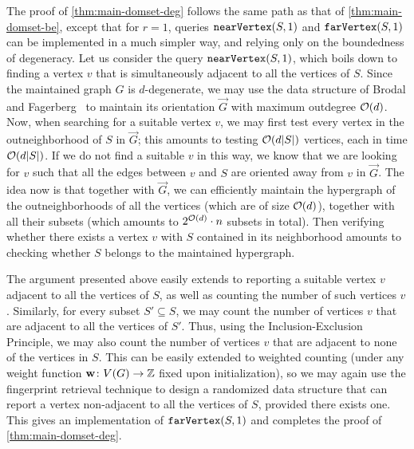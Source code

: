 \medskip

The proof of \cref{thm:main-domset-deg} follows the same path as that of \cref{thm:main-domset-be}, except that for $r=1$, queries $\mathtt{nearVertex}(S,1)$ and $\mathtt{farVertex}(S,1)$ can be implemented in a much simpler way, and relying only on the boundedness of degeneracy. Let us consider the query $\mathtt{nearVertex}(S,1)$, which boils down to finding a vertex $v$ that is simultaneously adjacent to all the vertices of $S$. Since the maintained graph $G$ is $d$-degenerate, we may use the data structure of Brodal and Fagerberg~\cite{BrodalF99} to maintain its orientation $\vec G$ with maximum outdegree $\mathcal{O}(d)$. Now, when searching for a suitable vertex $v$, we may first test every vertex in the outneighborhood of $S$ in $\vec G$; this amounts to testing $\mathcal{O}(d|S|)$ vertices, each in time $\mathcal{O}(d|S|)$. If we do not find a suitable $v$ in this way, we know that we are looking for $v$ such that all the edges between $v$ and $S$ are oriented away from $v$ in $\vec G$. The idea now is that together with $\vec G$, we can efficiently maintain the hypergraph of the outneighborhoods of all the vertices (which are of size $\mathcal{O}(d)$), together with all their subsets (which amounts to $2^{\mathcal{O}(d)}\cdot n$ subsets in total). Then verifying whether there exists a vertex $v$ with $S$ contained in its neighborhood amounts to checking whether $S$ belongs to the maintained hypergraph.

The argument presented above easily extends to reporting a suitable vertex $v$ adjacent to all the vertices of $S$, as well as counting the number of such vertices $v$. Similarly, for every subset $S'\subseteq S$, we may count the number of vertices $v$ that are adjacent to all the vertices of $S'$. Thus, using the Inclusion-Exclusion Principle, we may also count the number of vertices $v$ that are adjacent to none of the vertices in $S$. This can be easily extended to weighted counting (under any weight function $\mathbf{w}\colon V(G)\to \mathbb{Z}$ fixed upon initialization), so we may again use the fingerprint retrieval technique to design a randomized data structure that can report a vertex non-adjacent to all the vertices of $S$, provided there exists one. This gives an implementation of $\mathtt{farVertex}(S,1)$ and completes the proof of \cref{thm:main-domset-deg}.

\medskip

